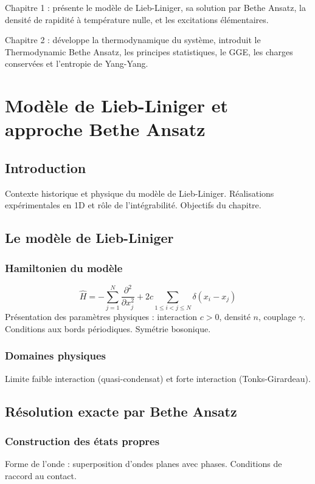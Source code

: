 
Chapitre 1 : présente le modèle de Lieb-Liniger, sa solution par Bethe Ansatz, la densité de rapidité à température nulle, et les excitations élémentaires.

Chapitre 2 : développe la thermodynamique du système, introduit le Thermodynamic Bethe Ansatz, les principes statistiques, le GGE, les charges conservées et l’entropie de Yang-Yang.

\chapter{Modèle de Lieb-Liniger et approche Bethe Ansatz}

\section*{Introduction}
Contexte historique et physique du modèle de Lieb-Liniger. Réalisations expérimentales en 1D et rôle de l'intégrabilité. Objectifs du chapitre.

\section{Le modèle de Lieb-Liniger}

\subsection{Hamiltonien du modèle}
\[
\hat{H} = -\sum_{j=1}^N \frac{\partial^2}{\partial x_j^2} + 2c \sum_{1 \leq i < j \leq N} \delta(x_i - x_j)
\]
Présentation des paramètres physiques : interaction $c > 0$, densité $n$, couplage $\gamma$. Conditions aux bords périodiques. Symétrie bosonique.

\subsection{Domaines physiques}
Limite faible interaction (quasi-condensat) et forte interaction (Tonks-Girardeau).

\section{Résolution exacte par Bethe Ansatz}

\subsection{Construction des états propres}
Forme de l’onde : superposition d’ondes planes avec phases. Conditions de raccord au contact.

